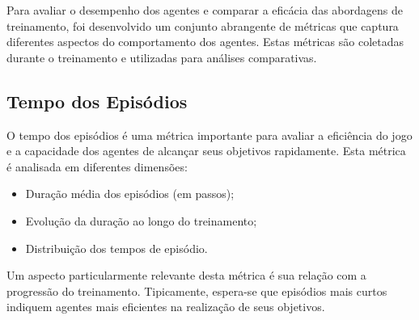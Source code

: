 Para avaliar o desempenho dos agentes e comparar a eficácia das abordagens de treinamento, foi desenvolvido um conjunto abrangente de métricas que captura diferentes aspectos do comportamento dos agentes. Estas métricas são coletadas durante o treinamento e utilizadas para análises comparativas.





\subsection{Tempo dos Episódios}

O tempo dos episódios é uma métrica importante para avaliar a eficiência do jogo e a capacidade dos agentes de alcançar seus objetivos rapidamente. Esta métrica é analisada em diferentes dimensões:

\begin{itemize}
    \item Duração média dos episódios (em passos);
    \item Evolução da duração ao longo do treinamento;
    \item Distribuição dos tempos de episódio.
\end{itemize}

Um aspecto particularmente relevante desta métrica é sua relação com a progressão do treinamento. Tipicamente, espera-se que episódios mais curtos indiquem agentes mais eficientes na realização de seus objetivos.

